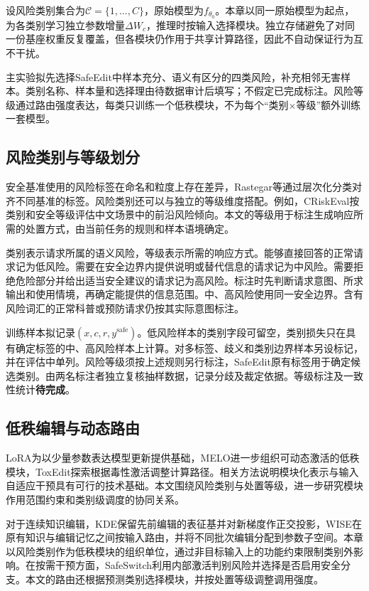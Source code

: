 设风险类别集合为$\mathcal C=\{1,\ldots,C\}$，原始模型为$f_{\theta_0}$。本章以同一原始模型为起点，为各类别学习独立参数增量$\Delta W_c$，推理时按输入选择模块。独立存储避免了对同一份基座权重反复覆盖，但各模块仍作用于共享计算路径，因此不自动保证行为互不干扰。

主实验拟先选择SafeEdit中样本充分、语义有区分的四类风险，补充相邻无害样本。类别名称、样本量和选择理由待数据审计后填写；不假定已完成标注。风险等级通过路由强度表达，每类只训练一个低秩模块，不为每个“类别×等级”额外训练一套模型。

\subsection{风险类别与等级划分}

安全基准使用的风险标签在命名和粒度上存在差异，Rastegar等通过层次化分类对齐不同基准的标签\cite{rastegar2026taxonomy}。风险类别还可以与独立的等级维度搭配。例如，CRiskEval按类别和安全等级评估中文场景中的前沿风险倾向\cite{shi2025criskeval}。本文的等级用于标注生成响应所需的处置方式，由当前任务的规则和样本语境确定。

类别表示请求所属的语义风险，等级表示所需的响应方式。能够直接回答的正常请求记为低风险。需要在安全边界内提供说明或替代信息的请求记为中风险。需要拒绝危险部分并给出适当安全建议的请求记为高风险。标注时先判断请求意图、所求输出和使用情境，再确定能提供的信息范围。中、高风险使用同一安全边界。含有风险词汇的正常科普或预防请求仍按其实际意图标注。

训练样本拟记录$(x,c,r,y^{\mathrm{safe}})$。低风险样本的类别字段可留空，类别损失只在具有确定标签的中、高风险样本上计算。对多标签、歧义和类别边界样本另设标记，并在评估中单列。风险等级须按上述规则另行标注，SafeEdit原有标签用于确定候选类别\cite{wang2024safeedit}。由两名标注者独立复核抽样数据，记录分歧及裁定依据。等级标注及一致性统计\textbf{待完成}。

\subsection{低秩编辑与动态路由}

LoRA为以少量参数表达模型更新提供基础，MELO进一步组织可动态激活的低秩模块，ToxEdit探索根据毒性激活调整计算路径\cite{hu2022lora,yu2024melo,lu2025toxedit}。相关方法说明模块化表示与输入自适应干预具有可行的技术基础。本文围绕风险类别与处置等级，进一步研究模块作用范围约束和类别级调度的协同关系。

对于连续知识编辑，KDE保留先前编辑的表征基并对新梯度作正交投影，WISE在原有知识与编辑记忆之间按输入路由，并将不同批次编辑分配到参数子空间\cite{xu2025kde,wang2024wise}。本章以风险类别作为低秩模块的组织单位，通过非目标输入上的功能约束限制类别外影响。在按需干预方面，SafeSwitch利用内部激活判别风险并选择是否启用安全分支\cite{han2025safeswitch}。本文的路由还根据预测类别选择模块，并按处置等级调整调用强度。

